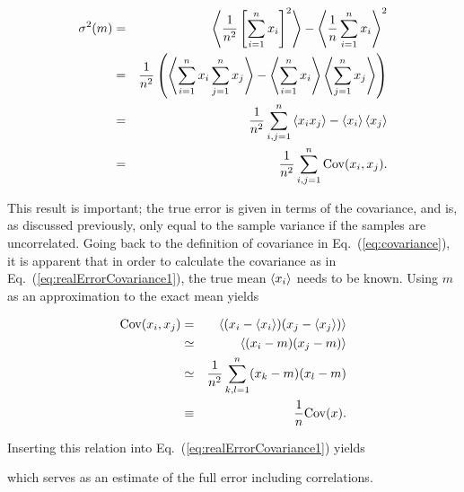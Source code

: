 \begin{eqnarray}
\label{eq:realErrorCovariance1}
  \sigma^2(m) &=& \left< \frac{1}{n^2}\left[\sum_{i=1}^nx_i\right]^2 \right> - \left< \frac{1}{n}\sum_{i=1}^n x_i \right>^2 \nonumber\\
              &=& \frac{1}{n^2}\left( \left< \sum_{i=1}^n x_i\sum_{j=1}^n x_j \right> - \left< \sum_{i=1}^n x_i \right>\left< \sum_{j=1}^n x_j \right>  \right) \nonumber\\
              &=& \frac{1}{n^2}\sum_{i,j=1}^n \left< x_ix_j \right> - \left< x_i \right>\left< x_j \right> \nonumber\\
              &=& \frac{1}{n^2}\sum_{i,j=1}^n \mathrm{Cov}(x_i, x_j).
\end{eqnarray}

This result is important; the true error is given in terms of the covariance, and is, as discussed previously, only equal to the sample variance if the samples are uncorrelated. Going back to the definition of covariance in Eq.~(\ref{eq:covariance}), it is apparent that in order to calculate the covariance as in Eq.~(\ref{eq:realErrorCovariance1}), the true mean $\left< x_i \right>$ needs to be known. Using $m$ as an  approximation to the exact mean yields   

\begin{eqnarray}
 \mathrm{Cov}(x_i, x_j) &=& \left< (x_i - \left< x_i \right>)(x_j - \left< x_j \right>) \right> \nonumber\\
                &\simeq& \left< (x_i - m)(x_j - m) \right> \nonumber\\
                &\simeq& \frac{1}{n^2}\sum_{k,l=1}^n (x_k-m)(x_l-m) \\
                &\equiv& \frac{1}{n}\mathrm{Cov}(x).
\end{eqnarray}

Inserting this relation into Eq.~(\ref{eq:realErrorCovariance1}) yields


which serves as an estimate of the full error including correlations. 

